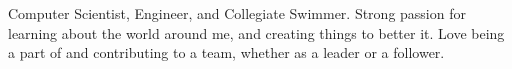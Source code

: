 

\begin{cvparagraph}

Computer Scientist, Engineer, and Collegiate Swimmer. Strong passion for learning about the world around me, and creating things to better it. Love being a part of and contributing to a team, whether as a leader or a follower.
\end{cvparagraph}
